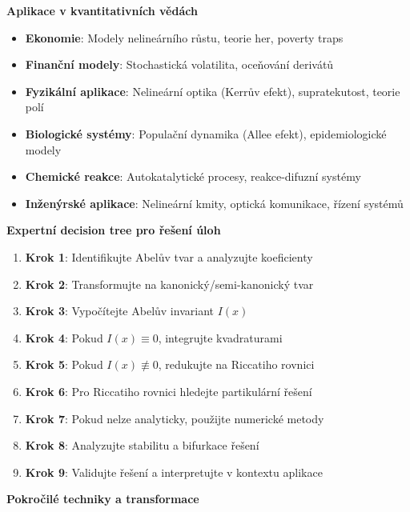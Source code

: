 \noindent\textbf{Aplikace v kvantitativních vědách}

\begin{itemize}
\item \textbf{Ekonomie}: Modely nelineárního růstu, teorie her, poverty traps
\item \textbf{Finanční modely}: Stochastická volatilita, oceňování derivátů
\item \textbf{Fyzikální aplikace}: Nelineární optika (Kerrův efekt), supratekutost, teorie polí
\item \textbf{Biologické systémy}: Populační dynamika (Allee efekt), epidemiologické modely
\item \textbf{Chemické reakce}: Autokatalytické procesy, reakce-difuzní systémy
\item \textbf{Inženýrské aplikace}: Nelineární kmity, optická komunikace, řízení systémů
\end{itemize}

\vspace{1\baselineskip}

\noindent\textbf{Expertní decision tree pro řešení úloh}

\begin{enumerate}
\item \textbf{Krok 1}: Identifikujte Abelův tvar a analyzujte koeficienty
\item \textbf{Krok 2}: Transformujte na kanonický/semi-kanonický tvar
\item \textbf{Krok 3}: Vypočítejte Abelův invariant $I(x)$
\item \textbf{Krok 4}: Pokud $I(x) \equiv 0$, integrujte kvadraturami
\item \textbf{Krok 5}: Pokud $I(x) \not\equiv 0$, redukujte na Riccatiho rovnici
\item \textbf{Krok 6}: Pro Riccatiho rovnici hledejte partikulární řešení
\item \textbf{Krok 7}: Pokud nelze analyticky, použijte numerické metody
\item \textbf{Krok 8}: Analyzujte stabilitu a bifurkace řešení
\item \textbf{Krok 9}: Validujte řešení a interpretujte v kontextu aplikace
\end{enumerate}

\vspace{1\baselineskip}

\noindent\textbf{Pokročilé techniky a transformace}

